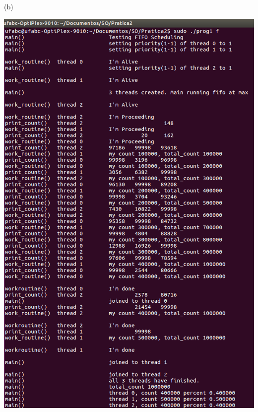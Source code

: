 \begin{minipage}{\textwidth}
\begin{minipage}[b]{0.32\textwidth}
        (b)
    \end{minipage}
    \hfill
    \begin{minipage}[b]{0.32\textwidth}
        \centering
        \includegraphics[trim=0 0 0 0,clip,scale=.25]{pratica2/prog1-f.png}
        

\end{minipage}
\end{minipage}
